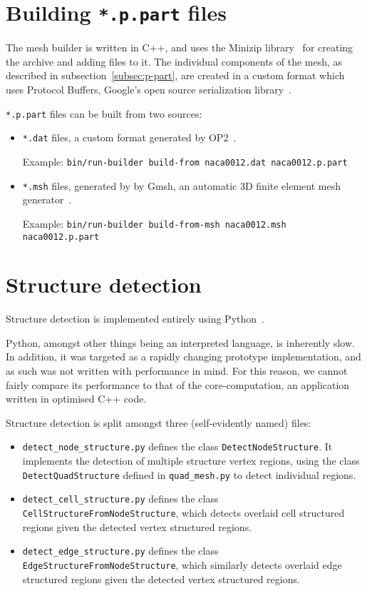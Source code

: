 \section{Building \texttt{*.p.part} files}
The mesh builder is written in C++, and uses the Minizip library~\cite{minizip} for creating the archive and adding files to it. The individual components of the mesh, as described in subsection~\ref{subsec:p-part}, are created in a custom format which uses Protocol Buffers, Google's open source serialization library~\cite{protocolbuffers}.

\texttt{*.p.part} files can be built from two sources:
\begin{itemize}
\item \texttt{*.dat} files, a custom format generated by OP2~\cite{airfoilgen}.

Example: \texttt{bin/run-builder build-from naca0012.dat naca0012.p.part}
\item \texttt{*.msh} files, generated by by Gmsh, an automatic 3D finite element mesh generator~\cite{geuzaine2008gmsh}.

Example: \texttt{bin/run-builder build-from-msh naca0012.msh naca0012.p.part}
\end{itemize}


\section{Structure detection}
Structure detection is implemented entirely using Python~\cite{python}.

Python, amongst other things being an interpreted language, is inherently slow. In addition, it was targeted as a rapidly changing prototype implementation, and as such was not written with performance in mind. For this reason, we cannot fairly compare its performance to that of the core-computation, an application written in optimised C++ code.

Structure detection is split amongst three (self-evidently named) files:
\begin{itemize}
\item \texttt{detect\_node\_structure.py} defines the class \lstinline|DetectNodeStructure|. It implements the detection of multiple structure vertex regions, using the class \lstinline|DetectQuadStructure| defined in \texttt{quad\_mesh.py} to detect individual regions.
\item \texttt{detect\_cell\_structure.py} defines the class \lstinline|CellStructureFromNodeStructure|, which detects overlaid cell structured regions given the detected vertex structured regions.
\item \texttt{detect\_edge\_structure.py} defines the class \lstinline|EdgeStructureFromNodeStructure|, which similarly detects overlaid edge structured regions given the detected vertex structured regions.
\end{itemize}

